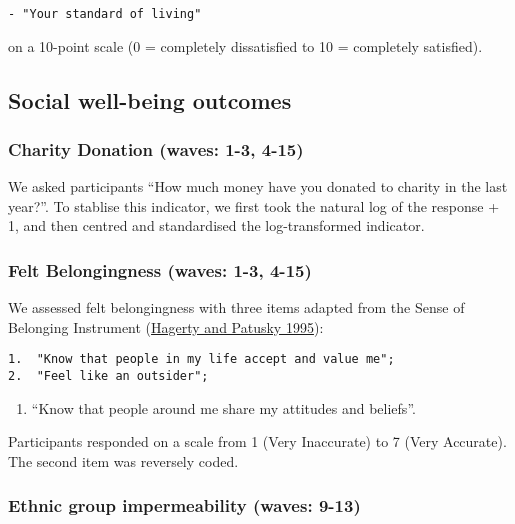 \documentclass[
  singlecolumn]{report}
\providecommand{\tightlist}{%
  \setlength{\itemsep}{0pt}\setlength{\parskip}{0pt}}\usepackage{longtable,booktabs,array}
\begin{document}
\begin{verbatim}
- "Your standard of living"
\end{verbatim}

on a 10-point scale (0 = completely dissatisfied to 10 = completely
satisfied).

\hypertarget{social-well-being-outcomes}{%
\subsection{Social well-being
outcomes}\label{social-well-being-outcomes}}

\hypertarget{charity-donation-waves-1-3-4-15}{%
\subsubsection{Charity Donation (waves: 1-3,
4-15)}\label{charity-donation-waves-1-3-4-15}}

We asked participants ``How much money have you donated to charity in
the last year?''. To stablise this indicator, we first took the natural
log of the response + 1, and then centred and standardised the
log-transformed indicator.

\hypertarget{felt-belongingness-waves-1-3-4-15}{%
\subsubsection{Felt Belongingness (waves: 1-3,
4-15)}\label{felt-belongingness-waves-1-3-4-15}}

We assessed felt belongingness with three items adapted from the Sense
of Belonging Instrument (\protect\hyperlink{ref-hagerty1995}{Hagerty and
Patusky 1995}):

\begin{verbatim}
1.  "Know that people in my life accept and value me";
2.  "Feel like an outsider";
\end{verbatim}

\begin{enumerate}
\def\labelenumi{\arabic{enumi}.}
\setcounter{enumi}{2}
\tightlist
\item
  ``Know that people around me share my attitudes and beliefs''.
\end{enumerate}

Participants responded on a scale from 1 (Very Inaccurate) to 7 (Very
Accurate). The second item was reversely coded.

\hypertarget{ethnic-group-impermeability-waves-9-13}{%
\subsubsection{Ethnic group impermeability (waves:
9-13)}\label{ethnic-group-impermeability-waves-9-13}}
\end{document}
